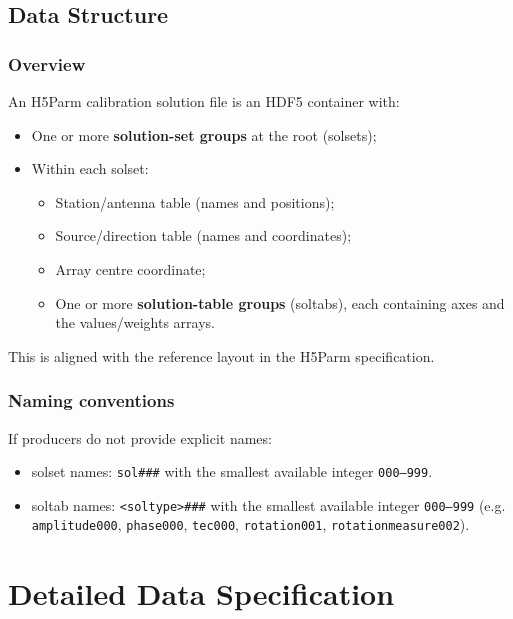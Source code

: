 \documentclass[a4paper,10pt,bibtotoc]{scrartcl}
\begin{document}
\subsection{Data Structure}
\label{sec:structure}

\subsubsection*{Overview}
An H5Parm calibration solution file is an HDF5 container with:
\begin{itemize}
  \item One or more \textbf{solution-set groups} at the root (solsets);
  \item Within each solset:
  \begin{itemize}
    \item Station/antenna table (names and positions);
    \item Source/direction table (names and coordinates);
    \item Array centre coordinate;
    \item One or more \textbf{solution-table groups} (soltabs), each containing axes and the
          values/weights arrays.
  \end{itemize}
\end{itemize}
This is aligned with the reference layout in the H5Parm specification. 

\subsubsection*{Naming conventions}
If producers do not provide explicit names:
\begin{itemize}
  \item solset names: \texttt{sol\#\#\#} with the smallest available integer \texttt{000--999}. 
  \item soltab names: \texttt{<soltype>\#\#\#} with the smallest available integer \texttt{000--999}
        (e.g. \texttt{amplitude000}, \texttt{phase000}, \texttt{tec000}, \texttt{rotation001}, \texttt{rotationmeasure002}). 
\end{itemize}



\section{Detailed Data Specification}\label{sec:details}
\end{document}
